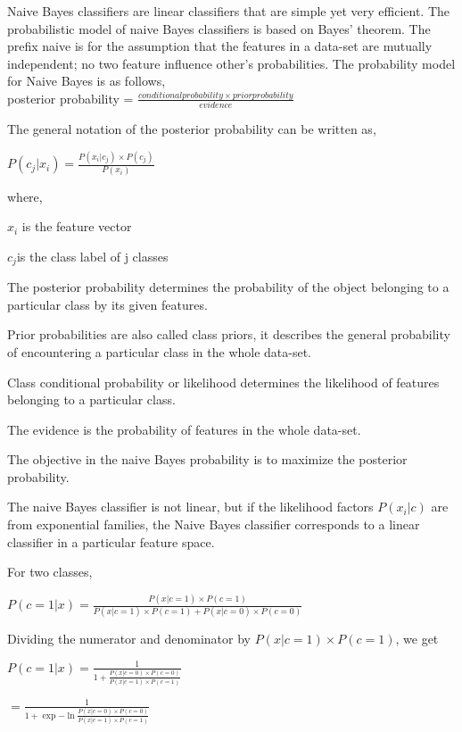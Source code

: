 \documentclass{exam}
\begin{document}
\begin{questions}
Naive Bayes classifiers are linear classifiers that are simple yet very efficient. The probabilistic model of naive Bayes classifiers is based on Bayes’ theorem. The prefix naive is for the assumption that the features in a data-set are mutually independent; no two feature influence other's probabilities. The probability model for Naive Bayes is as follows,\\

posterior probability = $\frac{conditional probability \times{prior probability}}{evidence}$

The general notation of the posterior probability can be written as,

$P(c_{j} | x_{i}) = \frac{P(x_{i} |c_{j} )\times{P(c_{j})}}{P(x_{i})}$

where,

$x_{i}$ is the feature vector

$c_{j}$is the class label of j classes

The posterior probability determines the probability of the object belonging to a particular class by its given features.

Prior probabilities are also called class priors, it describes the general probability of encountering a particular class in the whole data-set.

Class conditional probability or likelihood determines the likelihood of features belonging to a particular class.

The evidence is the probability of features in the whole data-set.

The objective in the naive Bayes probability is to maximize the posterior probability.

The naive Bayes classifier is not linear, but if the likelihood factors $P(x_{i}|c)$ are from exponential families, the Naive Bayes classifier corresponds to a linear classifier in a particular feature space. 

For two classes, 


$P(c = 1 | x ) = \frac{P( x | c = 1)\times{P(c = 1)}}{P( x | c = 1)\times{P(c = 1)} + P( x | c = 0)\times{P(c = 0)}}$

Dividing the numerator and denominator by $P( x | c = 1)\times{P(c = 1)}$, we get

$P(c = 1 | x ) = \frac{1}{1 + \frac{P( x | c = 0)\times{P(c = 0)}}{P( x | c = 1)\times{P(c = 1)}}}$

$=\frac{1}{1+ \exp{-\ln{\frac{P( x | c = 0)\times{P(c = 0)}}{P( x | c = 1)\times{P(c = 1)}}}}}$


\end{questions}
\end{document}
